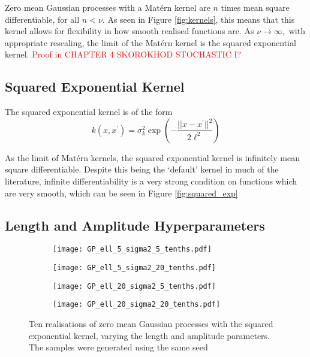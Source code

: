 Zero mean Gaussian processes with a Mat\'ern kernel are $n$ times mean square
differentiable, for all $n < \nu.$ As seen in Figure \ref{fig:kernels}, this
means that this kernel allows for flexibility in how smooth realised functions
are.
As $\nu\to\infty,$ with appropriate
rescaling, the limit of the Mat\'ern kernel is the squared exponential
kernel.\cite[85]{rasmussen_gaussian_2008}
\textcolor{red}{Proof in CHAPTER 4 SKOROKHOD STOCHASTIC I?}

\subsection*{Squared Exponential Kernel}

The squared exponential kernel is of the form
$$
    k(x, x^\prime)
    = \sigma^2_k\exp\left(-\frac{||x - x^\prime||^2}{2\ell^2}\right)
$$

As the limit of Mat\'ern kernels, the squared exponential kernel is infinitely
mean square differentiable. Despite this being the `default' kernel in much of
the literature, infinite differentiability is a very strong condition on
functions which are very smooth, which can be seen in Figure
\ref{fig:squared_exp}

\subsection*{Length and Amplitude Hyperparameters}

\begin{figure}[htbp]
    \centering
    \begin{subfigure}[b]{0.5\textwidth}
        \centering
        \texttt{[image: GP\_ell\_5\_sigma2\_5\_tenths.pdf]}
        \label{fig:half_half}
    \end{subfigure}%
    \hfill%
    \begin{subfigure}[b]{0.5\textwidth}
        \centering
        \texttt{[image: GP\_ell\_5\_sigma2\_20\_tenths.pdf]}
        \label{fig:half_two}
    \end{subfigure}
    \begin{subfigure}[b]{0.5\textwidth}
        \centering
        \texttt{[image: GP\_ell\_20\_sigma2\_5\_tenths.pdf]}
        \label{fig:two_half}
    \end{subfigure}%
    \hfill%
    \begin{subfigure}[b]{0.5\textwidth}
        \centering
        \texttt{[image: GP\_ell\_20\_sigma2\_20\_tenths.pdf]}
        \label{fig:two_two}
    \end{subfigure}%
    \caption{
        Ten realisations of zero mean Gaussian processes with the squared
        exponential kernel, varying the length and amplitude parameters.
        The samples were generated using the same seed
    }
    \label{fig:length_amp}
\end{figure}

